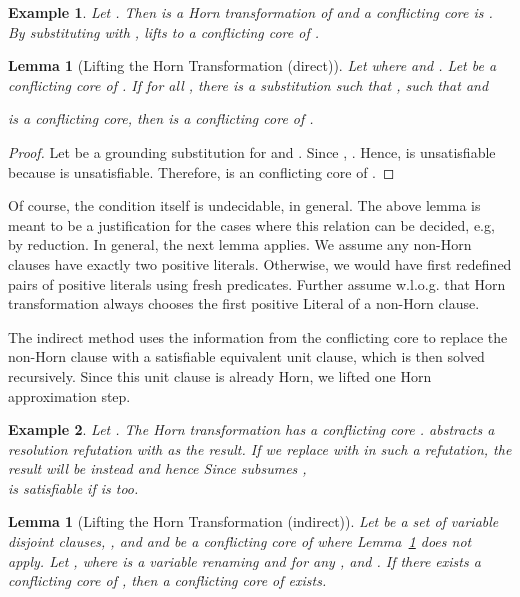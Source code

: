 \documentclass{llncs}
\newtheorem{lem}[theorem]{Lemma}
\newtheorem{exmp}{Example}
\begin{document}
\begin{exmp}\label{LiftHornEx}
Let  . 
Then   is a Horn transformation of 
and a conflicting core is  .
By substituting  with ,   lifts to   a conflicting core of .
\end{exmp} 

\begin{lem}[Lifting the Horn Transformation (direct)]\label{lifthorn1}
Let  where 
 and .
Let  be a conflicting core of .
If for all ,  there is a 
substitution  such that
,
such that  and 

is a conflicting core, then
 is
a conflicting core of .
\end{lem}

\begin{proof}
Let   be a grounding substitution for  and . 
Since ,
.
Hence,  is unsatisfiable because  is unsatisfiable.
Therefore,  is an conflicting core of .
\end{proof}


Of course, the condition  itself is undecidable, in general. The above lemma is meant to be a justification for
the cases where this relation can be decided, e.g, by reduction. In general, the next lemma applies.
We assume any non-Horn clauses have exactly two positive literals. 
Otherwise, we would have first redefined pairs of positive literals using fresh predicates. 
Further assume w.l.o.g. that Horn transformation always chooses the first positive Literal of a non-Horn clause.

The indirect method uses the information from the conflicting core to replace the non-Horn clause with a satisfiable equivalent unit clause,
which is then  solved recursively. Since this unit clause is already Horn, we lifted
one Horn approximation step.

\begin{exmp}
Let . 
The Horn transformation  has a conflicting core 
.
 abstracts a resolution refutation with  as the result.
If we replace   with  in such a refutation,  the result will be  instead and hence  
Since  subsumes , \\  is satisfiable if  is too.
\end{exmp} 


\begin{lem}[Lifting the Horn Transformation (indirect)]\label{lifthorn2}
Let  be a set of variable disjoint clauses, 
,
 and  and
 be a conflicting core of  where Lemma~\ref{lifthorn1} does not apply.
Let  , where  is a variable renaming and
 for any , and . 
If there exists a conflicting core  of , then a  conflicting core of  exists.
\end{lem}
\end{document}
